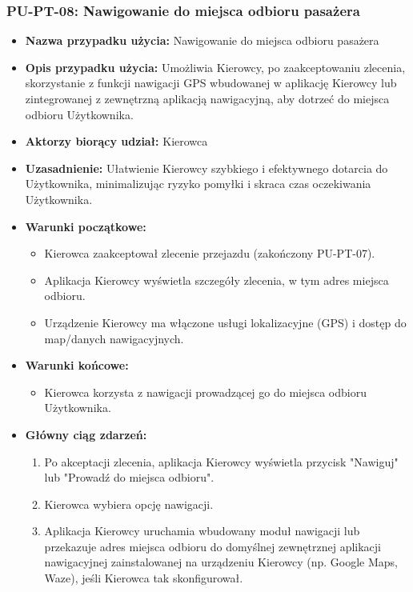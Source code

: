 \documentclass[a4paper,12pt]{article}
\begin{document}
\subsubsection{PU-PT-08: Nawigowanie do miejsca odbioru pasażera}
\begin{itemize}
    \item \textbf{Nazwa przypadku użycia:} Nawigowanie do miejsca odbioru pasażera
    \item \textbf{Opis przypadku użycia:} Umożliwia Kierowcy, po zaakceptowaniu zlecenia, skorzystanie z funkcji nawigacji GPS wbudowanej w aplikację Kierowcy lub zintegrowanej z zewnętrzną aplikacją nawigacyjną, aby dotrzeć do miejsca odbioru Użytkownika.
    \item \textbf{Aktorzy biorący udział:} Kierowca
    \item \textbf{Uzasadnienie:} Ułatwienie Kierowcy szybkiego i efektywnego dotarcia do Użytkownika, minimalizując ryzyko pomyłki i skraca czas oczekiwania Użytkownika.
    \item \textbf{Warunki początkowe:}
        \begin{itemize}
            \item Kierowca zaakceptował zlecenie przejazdu (zakończony PU-PT-07).
            \item Aplikacja Kierowcy wyświetla szczegóły zlecenia, w tym adres miejsca odbioru.
            \item Urządzenie Kierowcy ma włączone usługi lokalizacyjne (GPS) i dostęp do map/danych nawigacyjnych.
        \end{itemize}
    \item \textbf{Warunki końcowe:}
        \begin{itemize}
            \item Kierowca korzysta z nawigacji prowadzącej go do miejsca odbioru Użytkownika.
        \end{itemize}
    \item \textbf{Główny ciąg zdarzeń:}
        \begin{enumerate}
            \item Po akceptacji zlecenia, aplikacja Kierowcy wyświetla przycisk "Nawiguj" lub "Prowadź do miejsca odbioru".
            \item Kierowca wybiera opcję nawigacji.
            \item Aplikacja Kierowcy uruchamia wbudowany moduł nawigacji lub przekazuje adres miejsca odbioru do domyślnej zewnętrznej aplikacji nawigacyjnej zainstalowanej na urządzeniu Kierowcy (np. Google Maps, Waze), jeśli Kierowca tak skonfigurował.

\end{enumerate}
\end{itemize}
\end{document}
